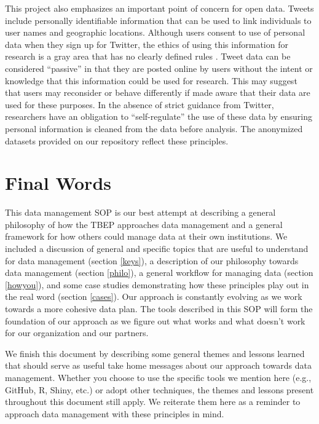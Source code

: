 \documentclass[
]{book}
\begin{document}
This project also emphasizes an important point of concern for open data. Tweets include personally identifiable information that can be used to link individuals to user names and geographic locations. Although users consent to use of personal data when they sign up for Twitter, the ethics of using this information for research is a gray area that has no clearly defined rules \citep{Zipper19}. Tweet data can be considered ``passive'' in that they are posted online by users without the intent or knowledge that this information could be used for research. This may suggest that users may reconsider or behave differently if made aware that their data are used for these purposes. In the absence of strict guidance from Twitter, researchers have an obligation to ``self-regulate'' the use of these data by ensuring personal information is cleaned from the data before analysis. The anonymized datasets provided on our repository reflect these principles.

\hypertarget{final}{%
\chapter{Final Words}\label{final}}

This data management SOP is our best attempt at describing a general philosophy of how the TBEP approaches data management and a general framework for how others could manage data at their own institutions. We included a discussion of general and specific topics that are useful to understand for data management (section \ref{keys}), a description of our philosophy towards data management (section \ref{philo}), a general workflow for managing data (section \ref{howyou}), and some case studies demonstrating how these principles play out in the real word (section \ref{cases}). Our approach is constantly evolving as we work towards a more cohesive data plan. The tools described in this SOP will form the foundation of our approach as we figure out what works and what doesn't work for our organization and our partners.

We finish this document by describing some general themes and lessons learned that should serve as useful take home messages about our approach towards data management. Whether you choose to use the specific tools we mention here (e.g., GitHub, R, Shiny, etc.) or adopt other techniques, the themes and lessons present throughout this document still apply. We reiterate them here as a reminder to approach data management with these principles in mind.
\end{document}

